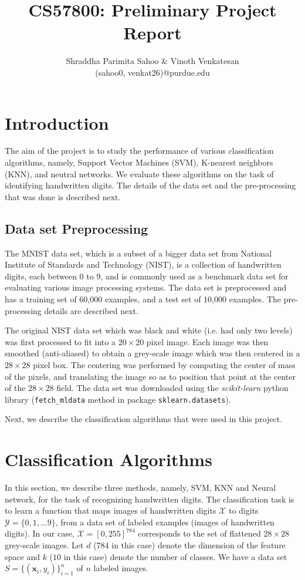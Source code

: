 \documentclass[10pt]{scrartcl}
\title{CS57800: Preliminary Project Report}
\author{Shraddha Parimita Sahoo \& Vinoth Venkatesan \\ (sahoo0, venkat26)@purdue.edu} %
\date{}
\newcommand{\vx}{\mathbf{x}}                        %
\begin{document}
\maketitle
\section*{Introduction} 
The aim of the project is to study the performance of various classification algorithms, namely, Support Vector Machines (SVM), K-nearest neighbors (KNN), and neutral networks. We evaluate these algorithms on the task of identifying handwritten digits.  The details of the data set and the pre-processing that was done
is described next.

\subsection*{Data set Preprocessing}
The MNIST data set, which is a subset of a bigger data set from National Institute of Standards and Technology (NIST),
is a collection of handwritten digits, each between 0 to 9, and is commonly used as a benchmark data set for evaluating various image processing systems.
The data set is preprocessed and has a training set of 60,000 examples, and a test set of 10,000 examples. The pre-processing details are described next.

The original NIST data set which was black and white (i.e. had only two levels) was first processed to fit into a $20 \times 20$ pixel image. 
Each image was then smoothed (anti-aliased) to obtain a grey-scale image which was then centered in a $28 \times 28$ pixel box.
The centering was performed by computing the center of mass of the pixels, and translating the image so as to position that point at the center of the $28 \times 28$ field. 
The data set was downloaded using the \emph{scikit-learn} python library (\texttt{fetch\_mldata} method in package \texttt{sklearn.datasets}).

Next, we describe the classification algorithms that were used in this project.

\section*{Classification Algorithms}
In this section, we describe three methods, namely, SVM, KNN and Neural network, for the task of recognizing handwritten digits. The classification
task is to learn a function that maps images of handwritten digits $\mathcal{X}$ to digits $\mathcal{Y} = \{0, 1, \ldots 9\}$,
from a data set of labeled examples (images of handwritten digits).
In our case, $\mathcal{X} = [0, 255]^{784}$ corresponds to the set of flattened $28 \times 28$ grey-scale images. 
Let $d$ ($784$ in this case) denote the dimension of the feature space and $k$ ($10$ in this case) denote the number of classes.
We have a data set $S = \{ (\vx_i, y_i)  \}_{i=1}^n$ of $n$ labeled images. 
\end{document}
